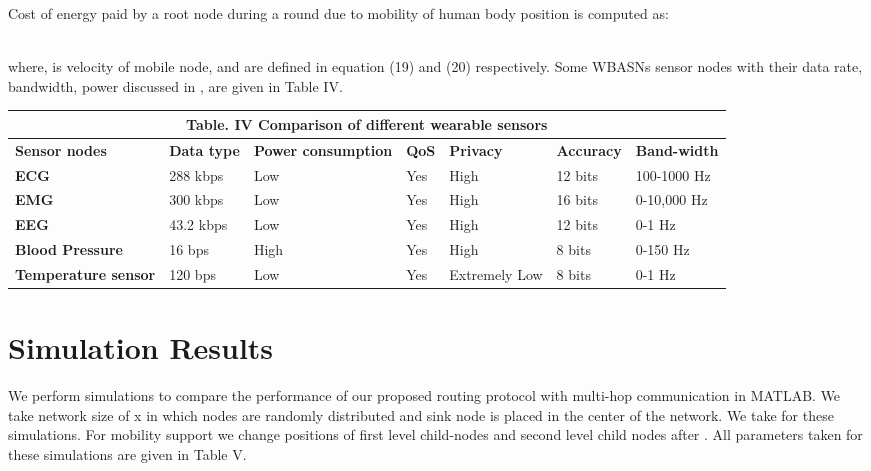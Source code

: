 \documentclass[journal]{IEEEtran}
\begin{document}
Cost of energy paid by a root node during a round due to mobility of human body position is computed as:


\\
where,  is velocity of mobile node,  and  are defined in equation (19) and (20) respectively.
Some WBASNs sensor nodes with their data rate, bandwidth, power discussed in \cite{ullah2010comprehensive}, \cite{ latre2011survey} are given in Table IV.

\begin{table*}[ht]
 \centering
\begin{tabular}{| p{3cm} || p{1.8cm} || p{2.5cm} || p{1.2cm} || p{1.5cm} || p{1.5cm}|| p{1.5cm}|}
  \multicolumn{7}{c}{Table. IV Comparison of different wearable sensors}\\
  \hline
  \textbf{Sensor nodes}&\textbf{Data type }&\textbf{Power consumption}&\textbf{QoS}&\textbf{Privacy}&\textbf{Accuracy}&\textbf{Band-width}  \\ \hline \hline
   \textbf{ECG} 	                & 288 kbps    &   Low    &  Yes      & High              & 12 bits  & 100-1000 Hz    \\ \hline
   \textbf{EMG}	                    & 300 kbps    &   Low	 &  Yes      & High              & 16 bits  & 0-10,000 Hz   \\ \hline
   \textbf{EEG} 	                & 43.2 kbps   &   Low    &  Yes      & High              & 12 bits  & 0-1 Hz         \\ \hline
   \textbf{Blood Pressure}          & 16 bps      &   High   &  Yes      & High              & 8 bits   & 0-150 Hz        \\ \hline
   \textbf{Temperature sensor } 	& 120 bps     &   Low	 &  Yes      & Extremely Low     & 8 bits   & 0-1 Hz          \\ \hline

\end{tabular}
\end{table*}
\section{Simulation Results}
We perform simulations to compare the performance of our proposed routing protocol with  multi-hop communication in MATLAB. We take network size of  x  in which  nodes are randomly distributed and sink node is placed in the center of the network. We take  for these simulations. For mobility support we change positions of first level child-nodes and second level child nodes after . All parameters taken for these simulations are given in Table V.
\end{document}
